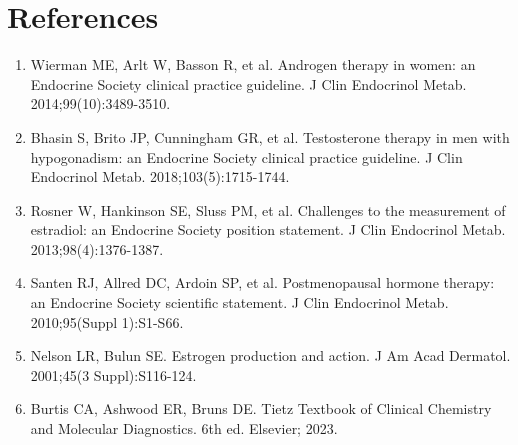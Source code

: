 \section*{References}
\begin{enumerate}
  \item Wierman ME, Arlt W, Basson R, et al. Androgen therapy in women: an Endocrine Society clinical practice guideline. J Clin Endocrinol Metab. 2014;99(10):3489-3510.
  \item Bhasin S, Brito JP, Cunningham GR, et al. Testosterone therapy in men with hypogonadism: an Endocrine Society clinical practice guideline. J Clin Endocrinol Metab. 2018;103(5):1715-1744.
  \item Rosner W, Hankinson SE, Sluss PM, et al. Challenges to the measurement of estradiol: an Endocrine Society position statement. J Clin Endocrinol Metab. 2013;98(4):1376-1387.
  \item Santen RJ, Allred DC, Ardoin SP, et al. Postmenopausal hormone therapy: an Endocrine Society scientific statement. J Clin Endocrinol Metab. 2010;95(Suppl 1):S1-S66.
  \item Nelson LR, Bulun SE. Estrogen production and action. J Am Acad Dermatol. 2001;45(3 Suppl):S116-124.
  \item Burtis CA, Ashwood ER, Bruns DE. Tietz Textbook of Clinical Chemistry and Molecular Diagnostics. 6th ed. Elsevier; 2023.
\end{enumerate}

\clearpage

